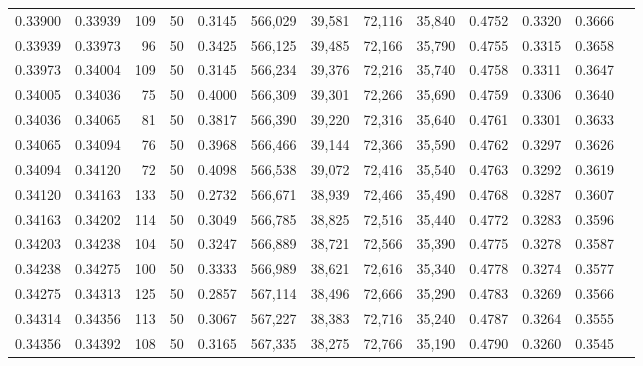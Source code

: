 \begin{tabular}{rrrrrrrrrrrrr}
0.33900 & 0.33939 &   109 &  50 &                                     0.3145 & 566,029 &  39,581 &  72,116 &  35,840 & 0.4752 & 0.3320 & 0.3666 \\
0.33939 & 0.33973 &    96 &  50 &                                     0.3425 & 566,125 &  39,485 &  72,166 &  35,790 & 0.4755 & 0.3315 & 0.3658 \\
0.33973 & 0.34004 &   109 &  50 &                                     0.3145 & 566,234 &  39,376 &  72,216 &  35,740 & 0.4758 & 0.3311 & 0.3647 \\
0.34005 & 0.34036 &    75 &  50 &                                     0.4000 & 566,309 &  39,301 &  72,266 &  35,690 & 0.4759 & 0.3306 & 0.3640 \\
0.34036 & 0.34065 &    81 &  50 &                                     0.3817 & 566,390 &  39,220 &  72,316 &  35,640 & 0.4761 & 0.3301 & 0.3633 \\
0.34065 & 0.34094 &    76 &  50 &                                     0.3968 & 566,466 &  39,144 &  72,366 &  35,590 & 0.4762 & 0.3297 & 0.3626 \\
0.34094 & 0.34120 &    72 &  50 &                                     0.4098 & 566,538 &  39,072 &  72,416 &  35,540 & 0.4763 & 0.3292 & 0.3619 \\
0.34120 & 0.34163 &   133 &  50 &                                     0.2732 & 566,671 &  38,939 &  72,466 &  35,490 & 0.4768 & 0.3287 & 0.3607 \\
0.34163 & 0.34202 &   114 &  50 &                                     0.3049 & 566,785 &  38,825 &  72,516 &  35,440 & 0.4772 & 0.3283 & 0.3596 \\
0.34203 & 0.34238 &   104 &  50 &                                     0.3247 & 566,889 &  38,721 &  72,566 &  35,390 & 0.4775 & 0.3278 & 0.3587 \\
0.34238 & 0.34275 &   100 &  50 &                                     0.3333 & 566,989 &  38,621 &  72,616 &  35,340 & 0.4778 & 0.3274 & 0.3577 \\
0.34275 & 0.34313 &   125 &  50 &                                     0.2857 & 567,114 &  38,496 &  72,666 &  35,290 & 0.4783 & 0.3269 & 0.3566 \\
0.34314 & 0.34356 &   113 &  50 &                                     0.3067 & 567,227 &  38,383 &  72,716 &  35,240 & 0.4787 & 0.3264 & 0.3555 \\
0.34356 & 0.34392 &   108 &  50 &                                     0.3165 & 567,335 &  38,275 &  72,766 &  35,190 & 0.4790 & 0.3260 & 0.3545 \\

\end{tabular}
